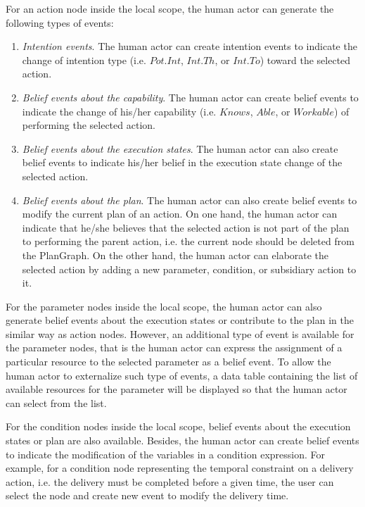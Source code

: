 For an action node inside the local scope, the human actor can generate the following types of events:

\begin{enumerate}
	\item \emph{Intention events}. The human actor can create intention events to indicate the change of intention type (i.e. $Pot.Int$, $Int.Th$, or $Int.To$) toward the selected action.
	\item \emph{Belief events about the capability}. The human actor can create belief events to indicate the change of his/her capability (i.e. $Knows$, $Able$, or $Workable$) of performing the selected action.
	\item \emph{Belief events about the execution states}. The human actor can also create belief events to indicate his/her belief in the execution state change of the selected action.
	\item \emph{Belief events about the plan}. The human actor can also create belief events to modify the current plan of an action. On one hand, the human actor can indicate that he/she believes that the selected action is not part of the plan to performing the parent action, i.e. the current node should be deleted from the PlanGraph. On the other hand, the human actor can elaborate the selected action by adding a new parameter, condition, or subsidiary action to it.
\end{enumerate}

For the parameter nodes inside the local scope, the human actor can also generate belief events about the execution states or contribute to the plan in the similar way as action nodes. However, an additional type of event is available for the parameter nodes, that is the human actor can express the assignment of a particular resource to the selected parameter as a belief event. To allow the human actor to externalize such type of events, a data table containing the list of available resources for the parameter will be displayed so that the human actor can select from the list.

For the condition nodes inside the local scope, belief events about the execution states or plan are also available. Besides, the human actor can create belief events to indicate the modification of the variables in a condition expression. For example, for a condition node representing the temporal constraint on a delivery action, i.e. the delivery must be completed before a given time, the user can select the node and create new event to modify the delivery time. 

